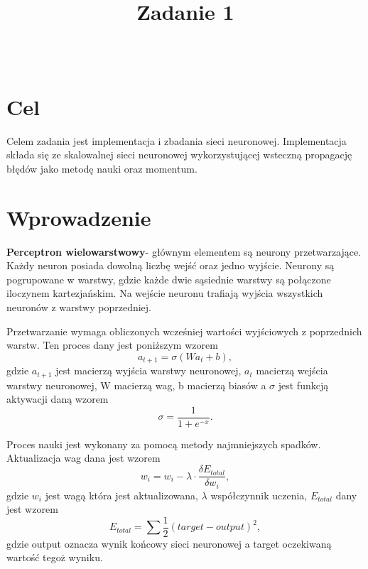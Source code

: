 \documentclass{classrep}
\author{%
  \studentinfo[215145@edu.p.lodz.pl]{Michał Chudzik}{215145}\\
  \studentinfo[210320@edu.p.lodz.pl]{Michał Sobczyk}{210320}%
}
\title{Zadanie 1}
\begin{document}
\maketitle
\thispagestyle{fancyplain}

\section{Cel}
	Celem zadania jest implementacja i zbadania sieci neuronowej. Implementacja składa się ze skalowalnej sieci neuronowej wykorzystującej wsteczną propagację błędów jako metodę nauki oraz momentum.

\section{Wprowadzenie}
	\textbf{Perceptron wielowarstwowy}-  głównym elementem są neurony przetwarzające. Każdy neuron posiada dowolną liczbę wejść oraz jedno wyjście. Neurony są pogrupowane w warstwy, gdzie każde dwie sąsiednie warstwy są połączone iloczynem kartezjańskim. Na wejście neuronu trafiają wyjścia wszystkich neuronów z warstwy poprzedniej.


Przetwarzanie wymaga obliczonych wcześniej wartości wyjściowych z poprzednich warstw. Ten proces dany jest poniższym wzorem
\begin{equation} \label{eq:feedforward}
	a_{t+1} = \sigma ( Wa_t + b),
\end{equation}
gdzie $a_{t+1}$ jest macierzą wyjścia warstwy neuronowej, $a_t$ macierzą wejścia warstwy neuronowej, W macierzą wag, b macierzą biasów a $\sigma$ jest funkcją aktywacji daną wzorem
\begin{equation} \label{eq:activation}
	\sigma = \frac{1}{1 + e^{-x}}.
\end{equation}


Proces nauki jest wykonany za pomocą metody najmniejszych spadków. Aktualizacja wag dana jest wzorem
\begin{equation} \label{eq:generalBackPropagationWeight}
	w_i = w_i - \lambda \cdot \frac{\delta E_{total}}{\delta w_i},
\end{equation}
gdzie $w_i$ jest wagą która jest aktualizowana, $\lambda$ współczynnik uczenia, $E_{total}$ dany jest wzorem
\begin{equation} \label{eq:totalError}
	E_{total} = \sum \frac{1}{2}(target - output)^2,
\end{equation}
gdzie output oznacza wynik końcowy sieci neuronowej a target oczekiwaną wartość tegoż wyniku.
\end{document}
